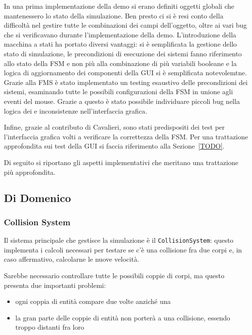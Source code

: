 In una prima implementazione della demo si erano definiti oggetti globali che mantenessero lo stato della simulazione.
Ben presto ci si è resi conto della difficoltà nel gestire tutte le combinazioni dei campi dell'oggetto, oltre
ai vari bug che si verificavano durante l'implementazione della demo.
L'introduzione della macchina a stati ha portato diversi vantaggi: si è semplificata la gestione dello
stato di simulazione, le precondizioni di esecuzione dei sistemi fanno riferimento allo stato della FSM e non più alla
combinazione di più variabili booleane e la logica di aggiornamento dei componenti della GUI si è semplificata
notevolemtne.
Grazie alla FMS è stato implementato un testing esaustivo delle precondizioni dei sistemi, esaminando tutte
le possibili configurazioni della FSM in unione agli eventi del mouse.
Grazie a questo è stato possibile individuare piccoli bug nella logica dei \System e inconsistenze nell'interfaccia
grafica.

Infine, grazie al contributo di Cavalieri, sono stati predispositi dei test per l'interfaccia grafica volti a verificare
la correttezza della FSM. Per una trattazione approfondita sui test della GUI si faccia riferimento alla
Sezione~\ref{TODO}.

Di seguito si riportano gli aspetti implementativi che meritano una trattazione più approfondita.

\subsection{Di Domenico}\label{subsec:demo-di-domenico}

\subsubsection{Collision System}\label{subsec:container}
Il sistema principale che gestisce la simulazione è il \texttt{CollisionSystem}: questo implementa i calcoli necessari
per testare se c'è una collisione fra due corpi e, in caso affermativo, calcolarne le nuove velocità.

Sarebbe necessario controllare tutte le possibili coppie di corpi, ma questo presenta due importanti problemi:
\begin{itemize}
    \item ogni coppia di entità compare due volte anziché una
    \item la gran parte delle coppie di entità non porterà a una collisione, essendo troppo distanti fra loro
\end{itemize}

